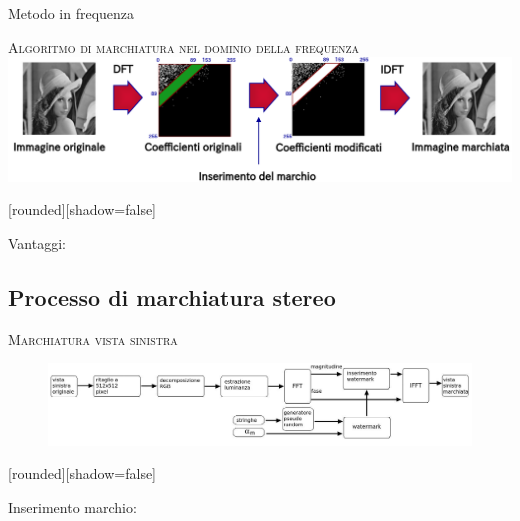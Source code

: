 \documentclass{beamer}
\begin{document}
\begin{section}{Metodo in frequenza}

\begin{frame}[t]{\textsc{Algoritmo di marchiatura nel dominio della frequenza}}
\vspace{1em}
\centering
\includegraphics[width=1\linewidth]{./img/dft.png}
\begin{center}
[rounded][shadow=false]
\begin{block}{Vantaggi:}
\end{block}
\end{center}
\end{frame}


\subsection{Processo di marchiatura stereo}

\begin{frame}[t]{\textsc{Marchiatura vista sinistra}}
\begin{figure}
  \includegraphics[width=1\textwidth]{./img_wat/left_wat.jpg}  
  \label{fig:leftwat}
\end{figure}

\begin{center}
[rounded][shadow=false]
\begin{block}{Inserimento marchio:}
\end{block}
\end{center}


\end{frame}
\end{section}
\end{document}
